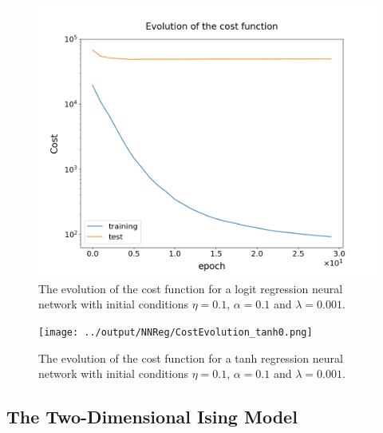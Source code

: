 \documentclass[nofootinbib,reprint,english]{revtex4-1}
\begin{document}
\begin{figure}[ht]
\centering
\includegraphics[scale=0.3]{../output/NNReg/CostEvolution_logit0_reshaped.png}
\caption{The evolution of the cost function for a logit regression neural network with initial conditions \(\eta=0.1\), \(\alpha=0.1\) and \(\lambda=0.001\).}\label{fig:NNReg_CostEvolution_logit}
\end{figure}

\begin{figure}[ht]
\centering
\texttt{[image: ../output/NNReg/CostEvolution\_tanh0.png]}
\caption{The evolution of the cost function for a tanh regression neural network with initial conditions \(\eta=0.1\), \(\alpha=0.1\) and \(\lambda=0.001\).}\label{fig:NNReg_CostEvolution_tanh}
\end{figure}

\newpage

\subsection{The Two-Dimensional Ising Model}
\end{document}
